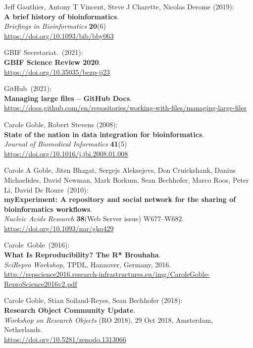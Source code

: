 \begin{thebibliography}{9}
Jeff Gauthier, Antony T Vincent, Steve J Charette, Nicolas Derome (2019):\\
\textbf{A brief history of bioinformatics}.\\
\emph{Briefings in Bioinformatics} \textbf{20}(6)\\
\url{https://doi.org/10.1093/bib/bby063}

GBIF Secretariat.~(2021):\\
\textbf{GBIF Science Review 2020}.\\
\url{https://doi.org/10.35035/bezp-jj23}

GitHub~(2021):\\
\textbf{Managing large files -- GitHub Docs}.\\
\url{https://docs.github.com/en/repositories/working-with-files/managing-large-files}

Carole Goble, Robert Stevens (2008): \\
\textbf{State of the nation in data integration for bioinformatics}.\\
\emph{Journal of Biomedical Informatics} \textbf{41}(5) \\
\url{https://doi.org/10.1016/j.jbi.2008.01.008}

Carole A Goble, Jiten Bhagat, Sergejs Aleksejevs, Don
Cruickshank, Danius Michaelides, David Newman, Mark Borkum, Sean
Bechhofer, Marco Roos, Peter Li, David De Roure~(2010):\\
\textbf{myExperiment: A repository and social network for the sharing of
bioinformatics workflows}.\\
\emph{Nucleic Acids Research} \textbf{38}(Web Server issue)
W677--W682.\\
\url{https://doi.org/10.1093/nar/gkq429}

Carole~Goble~(2016):\\
\textbf{What Is Reproducibility? The R* Brouhaha}.\\
\emph{SciRepro Workshop}, TPDL, Hannover, Germany, 2016.\\
\url{http://repscience2016.research-infrastructures.eu/img/CaroleGoble-ReproScience2016v2.pdf}

Carole Goble, Stian Soiland-Reyes, Sean Bechhofer (2018):\\
\textbf{Research Object Community Update}.\\
\emph{Workshop on Research Objects} (RO 2018), 29 Oct 2018, Amsterdam, Netherlands.\\
\url{https://doi.org/10.5281/zenodo.1313066}


\end{thebibliography}
